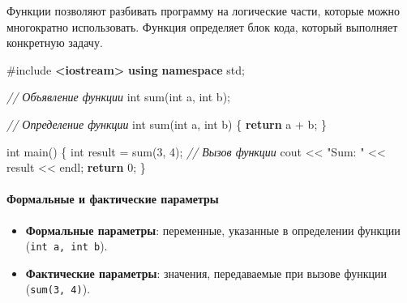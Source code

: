 \documentclass[
]{article}
\newenvironment{Shaded}{}{}
\newcommand{\CommentTok}[1]{\textcolor[rgb]{0.38,0.63,0.69}{\textit{#1}}}
\newcommand{\ControlFlowTok}[1]{\textcolor[rgb]{0.00,0.44,0.13}{\textbf{#1}}}
\newcommand{\DataTypeTok}[1]{\textcolor[rgb]{0.56,0.13,0.00}{#1}}
\newcommand{\DecValTok}[1]{\textcolor[rgb]{0.25,0.63,0.44}{#1}}
\newcommand{\ImportTok}[1]{\textcolor[rgb]{0.00,0.50,0.00}{\textbf{#1}}}
\newcommand{\KeywordTok}[1]{\textcolor[rgb]{0.00,0.44,0.13}{\textbf{#1}}}
\newcommand{\NormalTok}[1]{#1}
\newcommand{\OperatorTok}[1]{\textcolor[rgb]{0.40,0.40,0.40}{#1}}
\newcommand{\PreprocessorTok}[1]{\textcolor[rgb]{0.74,0.48,0.00}{#1}}
\newcommand{\StringTok}[1]{\textcolor[rgb]{0.25,0.44,0.63}{#1}}
\providecommand{\tightlist}{%
  \setlength{\itemsep}{0pt}\setlength{\parskip}{0pt}}
\begin{document}
Функции позволяют разбивать программу на логические части, которые можно
многократно использовать. Функция определяет блок кода, который
выполняет конкретную задачу.

\begin{Shaded}
\begin{Highlighting}[]
\PreprocessorTok{\#include }\ImportTok{\textless{}iostream\textgreater{}}
\KeywordTok{using} \KeywordTok{namespace}\NormalTok{ std}\OperatorTok{;}

\CommentTok{// Объявление функции}
\DataTypeTok{int}\NormalTok{ sum}\OperatorTok{(}\DataTypeTok{int}\NormalTok{ a}\OperatorTok{,} \DataTypeTok{int}\NormalTok{ b}\OperatorTok{);}

\CommentTok{// Определение функции}
\DataTypeTok{int}\NormalTok{ sum}\OperatorTok{(}\DataTypeTok{int}\NormalTok{ a}\OperatorTok{,} \DataTypeTok{int}\NormalTok{ b}\OperatorTok{)} \OperatorTok{\{}
    \ControlFlowTok{return}\NormalTok{ a }\OperatorTok{+}\NormalTok{ b}\OperatorTok{;}
\OperatorTok{\}}

\DataTypeTok{int}\NormalTok{ main}\OperatorTok{()} \OperatorTok{\{}
    \DataTypeTok{int}\NormalTok{ result }\OperatorTok{=}\NormalTok{ sum}\OperatorTok{(}\DecValTok{3}\OperatorTok{,} \DecValTok{4}\OperatorTok{);} \CommentTok{// Вызов функции}
\NormalTok{    cout }\OperatorTok{\textless{}\textless{}} \StringTok{"Sum: "} \OperatorTok{\textless{}\textless{}}\NormalTok{ result }\OperatorTok{\textless{}\textless{}}\NormalTok{ endl}\OperatorTok{;}
    \ControlFlowTok{return} \DecValTok{0}\OperatorTok{;}
\OperatorTok{\}}
\end{Highlighting}
\end{Shaded}

\paragraph{Формальные и фактические
параметры}\label{ux444ux43eux440ux43cux430ux43bux44cux43dux44bux435-ux438-ux444ux430ux43aux442ux438ux447ux435ux441ux43aux438ux435-ux43fux430ux440ux430ux43cux435ux442ux440ux44b}

\begin{itemize}
\tightlist
\item
  \textbf{Формальные параметры}: переменные, указанные в определении
  функции (\texttt{int\ a,\ int\ b}).
\item
  \textbf{Фактические параметры}: значения, передаваемые при вызове
  функции (\texttt{sum(3,\ 4)}).
\end{itemize}
\end{document}
